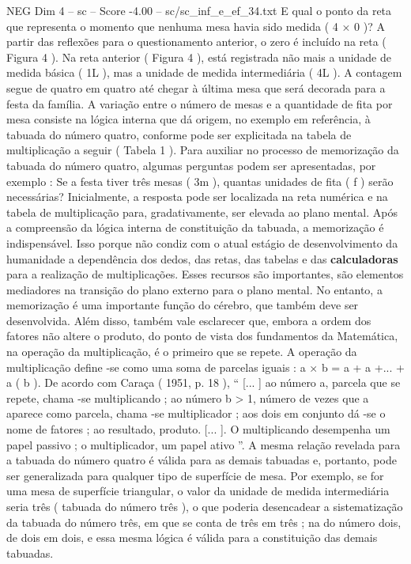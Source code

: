 \begin{textsample}{NEG Dim 4 – sc – Score -4.00 – sc/sc\_inf\_e\_ef\_34.txt}
E qual o ponto da reta que representa o momento que nenhuma mesa havia sido medida ( 4 × 0 )?
A partir das reflexões para o questionamento anterior, o zero é incluído na reta ( Figura 4 ).
Na reta anterior ( Figura 4 ), está registrada não mais a unidade de medida básica ( 1L ), mas a unidade de medida intermediária ( 4L ).
A contagem segue de quatro em quatro até chegar à última mesa que será decorada para a festa da família.
A variação entre o número de mesas e a quantidade de fita por mesa consiste na lógica interna que dá origem, no exemplo em referência, à tabuada do número quatro, conforme pode ser explicitada na tabela de multiplicação a seguir ( Tabela 1 ).
Para auxiliar no processo de memorização da tabuada do número quatro, algumas perguntas podem ser apresentadas, por exemplo : Se a festa tiver três mesas ( 3m ), quantas unidades de fita ( f ) serão necessárias?
Inicialmente, a resposta pode ser localizada na reta numérica e na tabela de multiplicação para, gradativamente, ser elevada ao plano mental.
Após a compreensão da lógica interna de constituição da tabuada, a memorização é indispensável.
Isso porque não condiz com o atual estágio de desenvolvimento da humanidade a dependência dos dedos, das retas, das tabelas e das \textbf{calculadoras} para a realização de multiplicações.
Esses recursos são importantes, são elementos mediadores na transição do plano externo para o plano mental.
No entanto, a memorização é uma importante função do cérebro, que também deve ser desenvolvida.
Além disso, também vale esclarecer que, embora a ordem dos fatores não altere o produto, do ponto de vista dos fundamentos da Matemática, na operação da multiplicação, é o primeiro que se repete.
A operação da multiplicação define -se como uma soma de parcelas iguais : a × b = a + a +... + a ( b ).
De acordo com Caraça ( 1951, p. 18 ), “ [... ] ao número a, parcela que se repete, chama -se multiplicando ; ao número b > 1, número de vezes que a aparece como parcela, chama -se multiplicador ; aos dois em conjunto dá -se o nome de fatores ; ao resultado, produto. [... ].
O multiplicando desempenha um papel passivo ; o multiplicador, um papel ativo ”.
A mesma relação revelada para a tabuada do número quatro é válida para as demais tabuadas e, portanto, pode ser generalizada para qualquer tipo de superfície de mesa.
Por exemplo, se for uma mesa de superfície triangular, o valor da unidade de medida intermediária seria três ( tabuada do número três ), o que poderia desencadear a sistematização da tabuada do número três, em que se conta de três em três ; na do número dois, de dois em dois, e essa mesma lógica é válida para a constituição das demais tabuadas.

\end{textsample}
